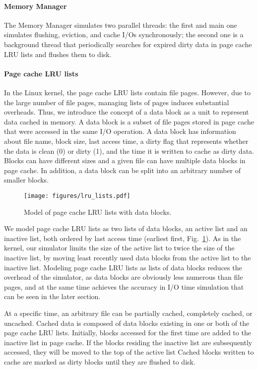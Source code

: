 \documentclass[conference]{IEEEtran}
\begin{document}
			\paragraph*{Memory Manager}
			The Memory Manager simulates  two parallel threads: the first and main one simulates 
			flushing, eviction, and cache I/Os synchronously; the second one is a background thread that  
			periodically searches for expired dirty data in page cache LRU lists 
			and flushes them to disk.

			\paragraph*{Page cache LRU lists}
			In the Linux kernel, the page cache LRU lists contain file pages. However, 
			due to the large number of file pages, managing lists of pages 
			induces substantial overheads.
			Thus, we introduce the concept of a data block as a unit to represent data 
			cached in memory. A data block is a subset of file pages stored in
            page cache that were accessed in the same I/O operation. 
			A data block has information about file name, block size, last access 
			time, a dirty flag that represents whether the data is clean (0) 
			or dirty (1), and the time it is written to cache as dirty data. 
			Blocks can have different sizes and a given file can have multiple 
			data blocks in page cache. In addition, a data block can be split into an 
			arbitrary number of smaller blocks.

			\begin{figure}
   				\centering
   				\texttt{[image: figures/lru\_lists.pdf]}
   				\caption{Model of page cache LRU lists with data blocks.}	\label{fig:lrulist}
			\end{figure}	
			
			We model page cache LRU lists as 
			two lists of data blocks, an active list and an inactive list, both ordered by 
			last access time (earliest first, Fig.~\ref{fig:lrulist}).
			As in the kernel, our simulator limits the size of the active list to
			twice the size of the inactive list, by moving least recently 
            used data blocks from the active list to the inactive list.
			Modeling page cache LRU lists as lists of data blocks reduces the
			overhead of the simulator, as data blocks are obviously less
			numerous than file pages, and at the same time achieves the accuracy in 
			I/O time simulation that can be seen in the later section.
			
			At a specific time, an arbitrary file can be partially cached, completely cached, 
			or uncached.
			Cached data is composed of data blocks existing in one or both
            of the page cache LRU lists. 
            Initially, blocks accessed for the first time are added to the inactive list in 
            page cache. 
            If the blocks residing the inactive list are subsequently accessed, 
            they will be moved to the top of the active list
            Cached blocks written to cache are marked as dirty blocks until 
            they are flushed to disk.
\end{document}
